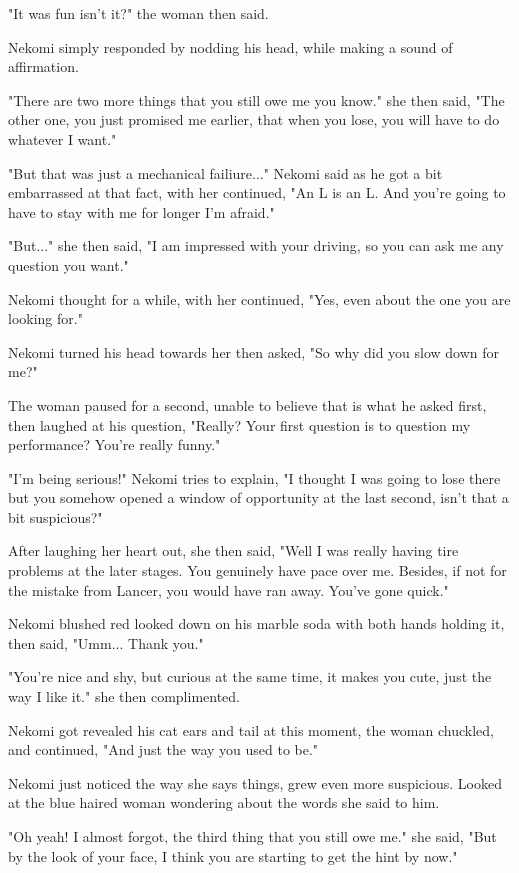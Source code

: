 "It was fun isn't it?" the woman then said.

Nekomi simply responded by nodding his head, while making a sound of affirmation.

"There are two more things that you still owe me you know." she then said, "The other one, you just promised me earlier, that when you lose, you will have to do whatever I want."

"But that was just a mechanical failiure..." Nekomi said as he got a bit embarrassed at that fact, with her continued, "An L is an L. And you're going to have to stay with me for longer I'm afraid."

"But..." she then said, "I am impressed with your driving, so you can ask me any question you want."

Nekomi thought for a while, with her continued, "Yes, even about the one you are looking for."

Nekomi turned his head towards her then asked, "So why did you slow down for me?"

The woman paused for a second, unable to believe that is what he asked first, then laughed at his question, "Really? Your first question is to question my performance? You're really funny."

"I'm being serious!" Nekomi tries to explain, "I thought I was going to lose there but you somehow opened a window of opportunity at the last second, isn't that a bit suspicious?"

After laughing her heart out, she then said, "Well I was really having tire problems at the later stages. You genuinely have pace over me. Besides, if not for the mistake from Lancer, you would have ran away. You've gone quick."

Nekomi blushed red looked down on his marble soda with both hands holding it, then said, "Umm... Thank you."

"You're nice and shy, but curious at the same time, it makes you cute, just the way I like it." she then complimented.

Nekomi got revealed his cat ears and tail at this moment, the woman chuckled, and continued, "And just the way you used to be."

Nekomi just noticed the way she says things, grew even more suspicious. Looked at the blue haired woman wondering about the words she said to him.

"Oh yeah! I almost forgot, the third thing that you still owe me." she said, "But by the look of your face, I think you are starting to get the hint by now."


